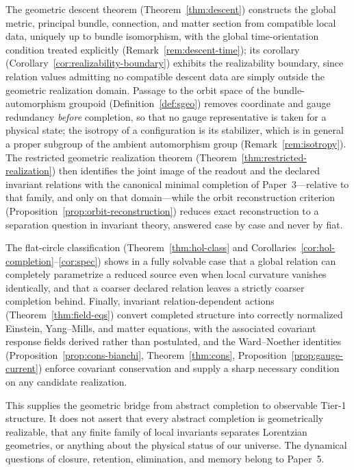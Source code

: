\documentclass[11pt,a4paper]{article}
\theoremstyle{plain}
\theoremstyle{definition}
\theoremstyle{remark}
\begin{document}
The geometric descent theorem (Theorem~\ref{thm:descent}) constructs the global metric, principal
bundle, connection, and matter section from compatible local data, uniquely up to bundle
isomorphism, with the global time-orientation condition treated explicitly
(Remark~\ref{rem:descent-time}); its corollary (Corollary~\ref{cor:realizability-boundary}) exhibits
the realizability boundary, since relation values admitting no compatible descent data are simply
outside the geometric realization domain. Passage to the orbit space of the bundle-automorphism
groupoid (Definition~\ref{def:sgeo}) removes coordinate and gauge redundancy \emph{before}
completion, so that no gauge representative is taken for a physical state; the isotropy of a
configuration is its stabilizer, which is in general a proper subgroup of the ambient automorphism
group (Remark~\ref{rem:isotropy}). The restricted geometric realization theorem
(Theorem~\ref{thm:restricted-realization}) then identifies the joint image of the readout and the
declared invariant relations with the canonical minimal completion of Paper~3---relative to that
family, and only on that domain---while the orbit reconstruction criterion
(Proposition~\ref{prop:orbit-reconstruction}) reduces exact reconstruction to a separation question
in invariant theory, answered case by case and never by fiat.

The flat-circle classification (Theorem~\ref{thm:hol-class} and
Corollaries~\ref{cor:hol-completion}--\ref{cor:spec}) shows in a fully solvable case that a global
relation can completely parametrize a reduced source even when local curvature vanishes identically,
and that a coarser declared relation leaves a strictly coarser completion behind. Finally, invariant
relation-dependent actions (Theorem~\ref{thm:field-eqs}) convert completed structure into correctly
normalized Einstein, Yang--Mills, and matter equations, with the associated covariant response
fields derived rather than postulated, and the Ward--Noether identities (Proposition~\ref{prop:cons-bianchi},
Theorem~\ref{thm:cons}, Proposition~\ref{prop:gauge-current}) enforce covariant conservation and
supply a sharp necessary condition on any candidate realization.

This supplies the geometric bridge from abstract completion to observable Tier-1 structure. It does
not assert that every abstract completion is geometrically realizable, that any finite family of
local invariants separates Lorentzian geometries, or anything about the physical status of our
universe. The dynamical questions of closure, retention, elimination, and memory belong to Paper~5.
\end{document}
